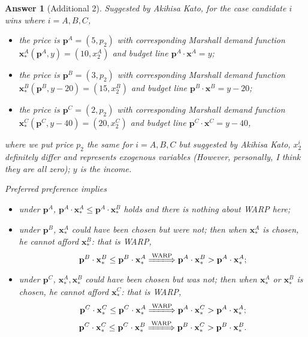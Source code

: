 \documentclass{article}
\newtheorem*{ans}{Answer}
\newcommand{\1}{{\bf 1}}
\newcommand{\0}{{\mathbf{0}}}
\newcommand{\p}{{\mathbf{p}}}
\newcommand{\x}{{\mathbf{x}}}
\newcommand{\<}{\langle}
\renewcommand{\>}{\rangle}
\begin{document}
\begin{ans}[Additional 2] 
Suggested by Akihisa Kato, for the case candidate $i$ wins where $i=A,B,C$,
\begin{itemize} 
	\item the price is $ \p^A = (5, p_2) $ with corresponding Marshall demand function $\x_*^A (\p^A,y) = (10, x_2^A)$ and budget line $\p^A \cdot \x^A = y$;
	\item the price is $ \p^B = (3, p_2) $ with corresponding Marshall demand function $\x_*^B (\p^B,y -20 ) = (15, x_2^B)$ and budget line $\p^B \cdot \x^B = y - 20$;
	\item the price is $ \p^C = (2, p_2) $ with corresponding Marshall demand function $\x_*^C (\p^C,y - 40 ) = (20, x_2^C)$  and budget line $\p^C \cdot \x^C = y - 40$,
	\end{itemize}
where we put price $p_2$ the same for $i=A,B,C$ but suggested by Akihisa Kato, $x_2^i$ definitely differ and represents exogenous variables (However, personally, I think they are all zero);  $y$ is the income.

Preferred preference implies
\begin{itemize}
	\item under $\p^A$, $\p^A\cdot \x_*^A \le \p^A \cdot \x_*^B$ holds and there is nothing about WARP here;
	\item under $\p^B$, $\x_*^A$ could have been chosen but were not; then when $\x_*^A$ is chosen, he cannot afford $\x_*^B$: that is WARP, 
	$$\p^B \cdot \x_*^B \le \p^B \cdot \x_*^A \xLongrightarrow{\text{WARP}}\p^A \cdot \x_*^B > \p^A \cdot \x_*^A;$$
	\item under $\p^C$, $\x_*^A, \x_*^B$ could have been chosen but was not; then when $\x_*^A$ or $\x_*^B$ is chosen, he cannot afford $\x_*^C$: that is WARP, $$\p^C \cdot \x_*^C \le \p^C \cdot \x_*^A \xLongrightarrow{\text{WARP}}\p^A \cdot \x_*^C > \p^A \cdot \x_*^A;$$
	$$\p^C \cdot \x_*^C \le \p^C \cdot \x_*^B \xLongrightarrow{\text{WARP}}\p^B \cdot \x_*^C > \p^B \cdot \x_*^B . $$
\end{itemize}


\end{ans}
\end{document}
